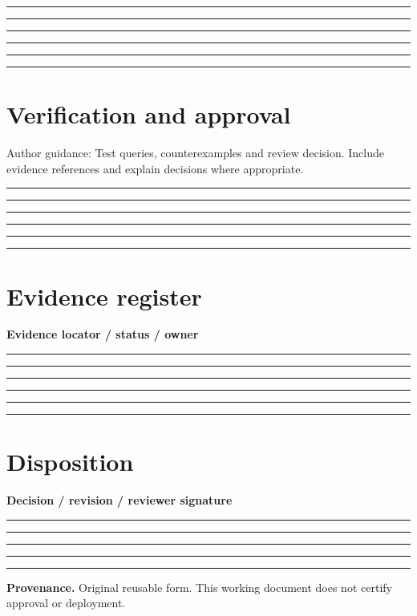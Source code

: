 \documentclass[11pt,letterpaper]{article}
\newcommand{\ResponseLine}{\par\vspace{1.05em}\noindent\rule{\linewidth}{0.4pt}\par}
\newcommand{\ResponseArea}{\ResponseLine\ResponseLine\ResponseLine}
\begin{document}
\ResponseArea\ResponseArea
\section{Verification and approval}
Author guidance: Test queries, counterexamples and review decision. Include evidence references and explain decisions where appropriate.


\ResponseArea\ResponseArea
\section{Evidence register}
\textbf{Evidence locator / status / owner}\ResponseArea\ResponseArea
\section{Disposition}
\textbf{Decision / revision / reviewer signature}\ResponseArea\ResponseLine
\vfill
\hrule
{\footnotesize\textbf{Provenance.} Original reusable form. This working document does not certify approval or deployment.}
\end{document}
